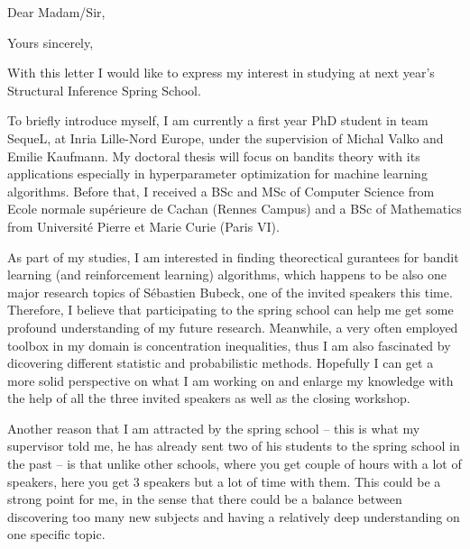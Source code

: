 \documentclass[11pt,a4paper,sans]{moderncv} %
\begin{document}


\clearpage

\opening{Dear Madam/Sir,} %
\closing{Yours sincerely,} %

\makelettertitle %


With this letter I would like to express my interest in studying at next year's Structural Inference Spring School.

To briefly introduce myself, I am currently a first year PhD student in team SequeL, at Inria Lille-Nord Europe, under the supervision of Michal Valko and Emilie Kaufmann. My doctoral thesis will focus on bandits theory with its applications especially in hyperparameter optimization for machine learning algorithms. Before that, I received a BSc and MSc of Computer Science from Ecole normale sup\'erieure de Cachan (Rennes Campus) and a BSc of Mathematics from Universit\'e Pierre et Marie Curie (Paris VI).

As part of my studies, I am interested in finding theorectical gurantees for bandit learning (and reinforcement learning) algorithms, which happens to be also one major research topics of S\'ebastien Bubeck, one of the invited speakers this time. Therefore, I believe that participating to the spring school can help me get some profound understanding of my future research. Meanwhile, a very often employed toolbox in my domain is concentration inequalities, thus I am also fascinated by dicovering different statistic and probabilistic methods. Hopefully I can get a more solid perspective on what I am working on and enlarge my knowledge with the help of all the three invited speakers as well as the closing workshop.

Another reason that I am attracted by the spring school -- this is what my supervisor told me, he has already sent two of his students to the spring school in the past -- is that unlike other schools, where you get couple of hours with a lot of speakers, here you get 3 speakers but a lot of time with them. This could be a strong point for me, in the sense that there could be a balance between discovering too many new subjects and having a relatively deep understanding on one specific topic.
\end{document}
